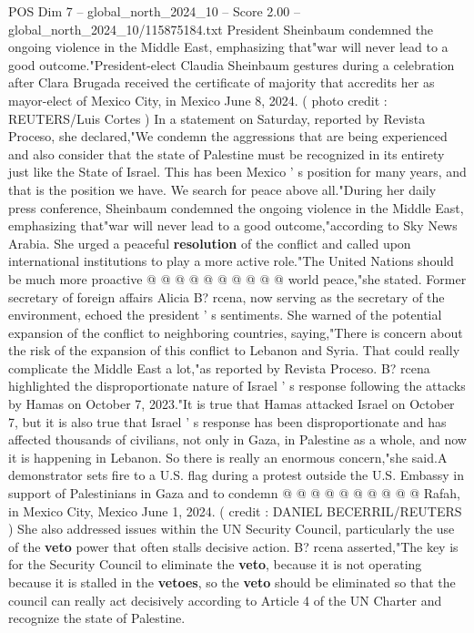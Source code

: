 \begin{textsample}{POS Dim 7 – global\_north\_2024\_10 – Score 2.00 – global\_north\_2024\_10/115875184.txt}  \label{ex:f7_pos_411}
President Sheinbaum condemned the ongoing violence in the Middle East, emphasizing that"war will never lead to a good outcome."President-elect Claudia Sheinbaum gestures during a celebration after Clara Brugada received the certificate of majority that accredits her as mayor-elect of Mexico City, in Mexico June 8, 2024. ( photo credit : REUTERS/Luis Cortes ) In a statement on Saturday, reported by Revista Proceso, she declared,"We condemn the aggressions that are being experienced and also consider that the state of Palestine must be recognized in its entirety just like the State of Israel.
This has been Mexico ' s position for many years, and that is the position we have.
We search for peace above all."During her daily press conference, Sheinbaum condemned the ongoing violence in the Middle East, emphasizing that"war will never lead to a good outcome,"according to Sky News Arabia.
She urged a peaceful \textbf{resolution} of the conflict and called upon international institutions to play a more active role."The United Nations should be much more proactive @ @ @ @ @ @ @ @ @ @ world peace,"she stated.
Former secretary of foreign affairs Alicia B? rcena, now serving as the secretary of the environment, echoed the president ' s sentiments.
She warned of the potential expansion of the conflict to neighboring countries, saying,"There is concern about the risk of the expansion of this conflict to Lebanon and Syria.
That could really complicate the Middle East a lot,"as reported by Revista Proceso.
B? rcena highlighted the disproportionate nature of Israel ' s response following the attacks by Hamas on October 7, 2023."It is true that Hamas attacked Israel on October 7, but it is also true that Israel ' s response has been disproportionate and has affected thousands of civilians, not only in Gaza, in Palestine as a whole, and now it is happening in Lebanon.
So there is really an enormous concern,"she said.A demonstrator sets fire to a U.S. flag during a protest outside the U.S.
Embassy in support of Palestinians in Gaza and to condemn @ @ @ @ @ @ @ @ @ @ Rafah, in Mexico City, Mexico June 1, 2024. ( credit : DANIEL BECERRIL/REUTERS ) She also addressed issues within the UN Security Council, particularly the use of the \textbf{veto} power that often stalls decisive action.
B? rcena asserted,"The key is for the Security Council to eliminate the \textbf{veto}, because it is not operating because it is stalled in the \textbf{vetoes}, so the \textbf{veto} should be eliminated so that the council can really act decisively according to Article 4 of the UN Charter and recognize the state of Palestine.

\end{textsample}
